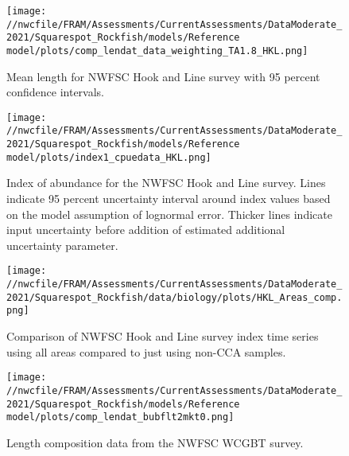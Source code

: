 \documentclass[11pt,
  english,
  a4paper,
]{article}
\begin{document}
\begin{figure}
\centering
\texttt{[image: //nwcfile/FRAM/Assessments/CurrentAssessments/DataModerate\_2021/Squarespot\_Rockfish/models/Reference model/plots/comp\_lendat\_data\_weighting\_TA1.8\_HKL.png]}
\caption{Mean length for NWFSC Hook and Line survey with 95 percent confidence intervals.\label{fig:mean-hkl-len-data}}
\end{figure}

\tagmcend\tagstructend


\begin{figure}
\centering
\texttt{[image: //nwcfile/FRAM/Assessments/CurrentAssessments/DataModerate\_2021/Squarespot\_Rockfish/models/Reference model/plots/index1\_cpuedata\_HKL.png]}
\caption{Index of abundance for the NWFSC Hook and Line survey. Lines indicate 95 percent uncertainty interval around index values based on the model assumption of lognormal error. Thicker lines indicate input uncertainty before addition of estimated additional uncertainty parameter.\label{fig:hkl-index}}
\end{figure}

\tagmcend\tagstructend


\begin{figure}
\centering
\texttt{[image: //nwcfile/FRAM/Assessments/CurrentAssessments/DataModerate\_2021/Squarespot\_Rockfish/data/biology/plots/HKL\_Areas\_comp.png]}
\caption{Comparison of NWFSC Hook and Line survey index time series using all areas compared to just using non-CCA samples.\label{fig:hkl-index-comparison}}
\end{figure}

\tagmcend\tagstructend


\begin{figure}
\centering
\texttt{[image: //nwcfile/FRAM/Assessments/CurrentAssessments/DataModerate\_2021/Squarespot\_Rockfish/models/Reference model/plots/comp\_lendat\_bubflt2mkt0.png]}
\caption{Length composition data from the NWFSC WCGBT survey.\label{fig:wcgbts-len-data}}
\end{figure}
\end{document}
